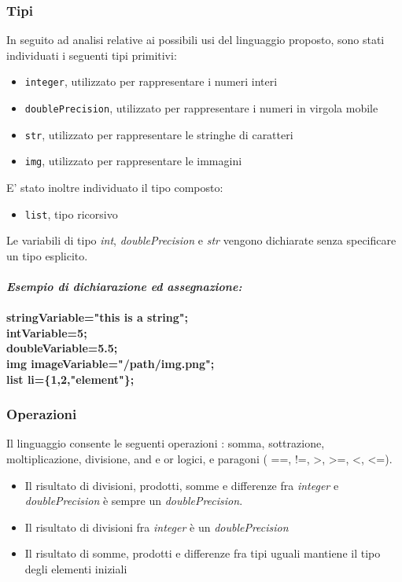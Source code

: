 \documentclass[10pt]{article}
\begin{document}
\subsubsection{Tipi}
In seguito ad analisi relative ai possibili usi del linguaggio proposto, sono stati individuati i seguenti tipi primitivi:
\begin{itemize}
	\item \texttt{integer}, utilizzato per rappresentare i numeri interi
	\item \texttt{doublePrecision}, utilizzato per rappresentare i numeri in virgola mobile
	\item \texttt{str}, utilizzato per rappresentare le stringhe di caratteri
	\item \texttt{img}, utilizzato per rappresentare le immagini
\end{itemize}
E' stato inoltre individuato il tipo composto:
\begin{itemize}
	\item \texttt{list}, tipo ricorsivo
\end{itemize}
Le variabili di tipo \textit{int}, \textit{doublePrecision} e \textit{str} vengono dichiarate senza specificare un tipo esplicito.\\\\
\textit{\textbf{Esempio di dichiarazione ed assegnazione:}}\\\\
\textbf{stringVariable="this is a string";}\\
\textbf{intVariable=5;}\\
\textbf{doubleVariable=5.5;}\\
\textbf{img imageVariable="/path/img.png";}\\
\textbf{list li=\{1,2,"element"\};}\\

\subsubsection{Operazioni}
Il linguaggio consente le seguenti operazioni : somma, sottrazione, moltiplicazione, divisione, and e or logici, e paragoni ( ==, !=, >, >=, <, <=).

\begin{itemize}
	\item Il risultato di divisioni, prodotti, somme e differenze fra \textit{integer} e \textit{doublePrecision} è sempre un \textit{doublePrecision}.
	\item Il risultato di divisioni fra \textit{integer} è un \textit{doublePrecision}
	\item Il risultato di somme, prodotti e differenze fra tipi uguali mantiene il tipo degli elementi iniziali
\end{itemize}
\end{document}
